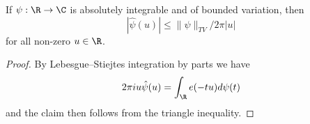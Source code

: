 \begin{lemma}
\label{prelim-decay-2}
\leanok
If $\psi:\R \to \C$ is absolutely integrable and of bounded variation, then
$$ |\hat \psi(u)| \leq \| \psi \|_{TV} / 2\pi |u| $$
for all non-zero $u \in \R$.
\end{lemma}
\begin{proof}
By Lebesgue--Stiejtes integration by parts we have
$$ 2\pi i u \hat \psi(u) = \int _\R e(-tu) d\psi(t)$$
and the claim then follows from the triangle inequality.
\end{proof}
